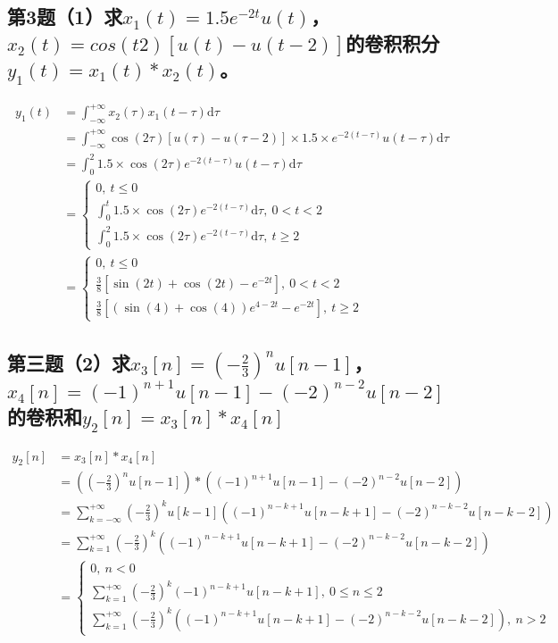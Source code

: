 \documentclass[UTF8]{ctexart}
\begin{document}
\subsection[第3题（1）]{第3题（1）求\texorpdfstring{$x_1(t)=1.5e^{-2t}u(t)$}{x1}，\texorpdfstring{$x_2(t)=cos(t2)[u(t)-u(t-2)]$}{x2}的卷积积分\texorpdfstring{$y_1(t)=x_1(t)*x_2(t)$}{y1}。 }
\begin{align}
y_1(t)
& =\int_{-\infty}^{+\infty}x_2(\tau)x_1(t-\tau)\mathrm{d}\tau \\
& =\int_{-\infty}^{+\infty}\cos(2\tau)[u(\tau)-u(\tau -2)]\times1.5\times e^{-2(t-\tau)}u(t-\tau)\mathrm{d}\tau \\
& =\int_{0}^{2}1.5\times \cos(2\tau)e^{-2(t-\tau)}u(t-\tau) \mathrm{d}\tau \\
& = \begin{cases}
	0,\ t\leq0 \\
	\int_{0}^{t}1.5\times \cos(2\tau)e^{-2(t-\tau)}\mathrm{d}\tau,\ 0 < t < 2 \\
	\int_{0}^{2}1.5\times \cos(2\tau)e^{-2(t-\tau)}\mathrm{d}\tau,\ t \geq2
	\end{cases} \\
& = \begin{cases}
	0,\ t\leq0 \\
	\frac{3}{8}[\sin(2t)+\cos(2t)-e^{-2t}], \ 0 < t < 2 \\
	\frac{3}{8}[(\sin(4)+\cos(4))e^{4-2t}-e^{-2t}], \ t \geq 2
	\end{cases}
\end{align}

\subsection[第3题（2）]{第三题（2）求\texorpdfstring{$x_3[n]=(-\frac{2}{3})^n u[n-1]$}{x3}，\texorpdfstring{$x_4[n]=(-1)^{n+1}u[n-1]-(-2)^{n-2}u[n-2]$}{x4}的卷积和\texorpdfstring{$y_2[n]
=x_3[n]*x_4[n]$}{y2}}
\begin{align}
y_2[n]
&=x_3[n]*x_4[n] \\
&=((-\frac{2}{3})^n u[n-1])*((-1)^{n+1}u[n-1]-(-2)^{n-2}u[n-2]) \\
&=\sum_{k=-\infty}^{+\infty}(-\frac{2}{3})^k u[k-1]((-1)^{n-k+1}u[n-k+1]-(-2)^{n-k-2}u[n-k-2]) \\
&=\sum_{k=1}^{+\infty}(-\frac{2}{3})^k ((-1)^{n-k+1}u[n-k+1]-(-2)^{n-k-2}u[n-k-2]) \\
&=
\begin{cases}
	0, \ n<0 \\
	\sum_{k=1}^{+\infty}(-\frac{2}{3})^k (-1)^{n-k+1}u[n-k+1], \ 0 \leq n \leq 2 \\
	\sum_{k=1}^{+\infty}(-\frac{2}{3})^k ((-1)^{n-k+1}u[n-k+1]-(-2)^{n-k-2}u[n-k-2]),\ n>2
\end{cases}
\end{align}
\end{document}
